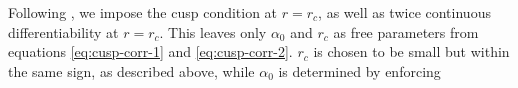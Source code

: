 Following , we impose the cusp condition at $r=r_c$, as well as twice continuous differentiability at $r=r_c$. This leaves only $\alpha_0$ and $r_c$ as free parameters from equations \ref{eq:cusp-corr-1} and \ref{eq:cusp-corr-2}. $r_c$ is chosen to be small but within the same sign, as described above, while $\alpha_0$ is determined by enforcing






